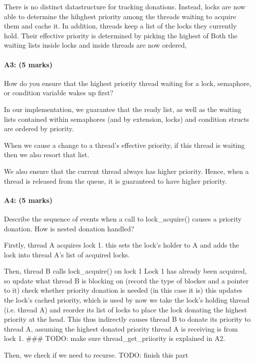 There is no distinct datastructure for tracking donations.
Instead, locks are now able to determine the hihghest priority among the threads waiting to acquire them and cache it.
In addition, threads keep a list of the locks they currently hold. Their effective priority is determined by picking the highest of 
Both the waiting lists inside locks and inside threads are now ordered, 

\paragraph{A3: (5 marks)}
How do you ensure that the highest priority thread waiting for a lock, semaphore, or condition variable wakes up first?

In our implementation, we guarantee that the ready list, as well as the waiting lists contained within semaphores (and by extension, locks) and condition structs are ordered by priority.

When we cause a change to a thread's effective priority, if this thread is waiting then we also resort that list.

We also ensure that the current thread always has higher priority.
Hence, when a thread is released from the queue, it is guaranteed to have higher priority.

\paragraph{A4: (5 marks)}
Describe the sequence of events when a call to lock\_acquire() causes a priority donation.  How is nested donation handled?

  Firstly, thread A acquires lock 1.
    this sets the lock's holder to A and adds the lock into thread A's list of acquired locks.

  Then, thread B calls lock_acquire() on lock 1
  Lock 1 has already been acquired, so
    update what thread B is blocking on (record the type of blocker and a pointer to it)
    check whether priority donation is needed (in this case it is)
      this updates the lock's cached priority, which is used by 
    now we take the lock's holding thread (i.e. thread A) and reorder its list of locks to place the lock donating the highest priority at the head. This thus indirectly causes thread B to donate its priority to thread A, assuming the highest donated priority thread A is receiving is from lock 1.
    ### TODO: make sure thread_get_priiority is explained in A2.

    Then, we check if we need to recurse. TODO: finish this part


